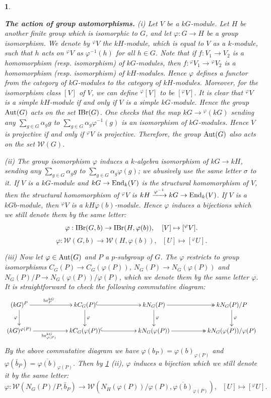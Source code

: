 \documentclass[preprint,12pt,3p]{elsarticle}
\newtheorem{void}[theorem]{}
\def\IBr{{\rm IBr}}
\def\br{{\rm br}}
\def\Aut{{\rm Aut}}
\def\End{{\rm End}}
\def\W{\mathcal{W}}
\begin{document}
\begin{void}\label{void:The action of group automorphisms}
{\rm \textbf{The action of group automorphisms.} (i) Let $V$ be a $kG$-module. Let $H$ be another finite group which is isomorphic to $G$, and let $\varphi:G\to H$ be a group isomorphism. We denote by ${}^\varphi V$ the $kH$-module, which is equal to $V$ as a $k$-module, such that $h$ acts on ${}^\varphi V$ as $\varphi^{-1}(h)$ for all $h\in G$. Note that if $f:V_1\to V_2$ is a homomorphism (resp. isomorphism) of $kG$-modules, then $f:{}^\varphi V_1\to {}^\varphi V_2$ is a homomorphism (resp. isomorphism) of $kH$-modules. Hence $\varphi$ defines a functor from the category of $kG$-modules to the category of $kH$-modules. Moreover, for the isomorphism class $[V]$ of $V$, we can define ${}^\varphi[V]$ to be $[{}^\varphi V]$. It is clear that ${}^\varphi V$ is a simple $kH$-module if and only if $V$ is a simple $kG$-module. Hence the group $\Aut(G)$ acts on the set $\IBr(G)$. One checks that the map $kG\to {}^\varphi(kG)$ sending any $\sum_{g\in G}\alpha_gg$ to $\sum_{g\in G} \alpha_g\varphi^{-1}(g)$ is an isomorphism of $kG$-modules. Hence $V$ is projective if and only if ${}^\varphi V$ is projective. Therefore, the group $\Aut(G)$ also acts on the set $\W(G)$. 
	

(ii) The group isomorphism $\varphi$ induces a $k$-algebra isomorphism of $kG\to kH$, sending any $\sum_{g\in G}\alpha_gg$ to $\sum_{g\in G}\alpha_g\varphi(g)$; we abusively use the same letter $\sigma$ to it. If $V$ is a $kG$-module and $kG\to \End_k(V)$ is the structural homomorphism of $V$, then the structural homomorphism of ${}^\varphi V$ is $kH\xrightarrow{\varphi^{-1}} kG\to \End_k(V)$. If $V$ is a $kGb$-module, then ${}^\varphi V$ is a $kH\varphi(b)$-module. Hence $\varphi$ induces a bijections which we still denote them by the same letter:
$$\varphi:\IBr(G,b)\to \IBr(H,\varphi(b)),~~~[V]\mapsto [{}^\varphi V].$$
$$\varphi:\W(G,b)\to \W(H,\varphi(b)),~~~[U]\mapsto [{}^\varphi U].$$

(iii) Now let $\varphi\in \Aut(G)$ and $P$ a $p$-subgroup of $G$. The $\varphi$ restricts to group isomorphisms $C_G(P)\to C_G(\varphi(P))$, $N_G(P)\to N_G(\varphi(P))$ and $N_G(P)/P\to N_G(\varphi(P))/\varphi(P)$, which we denote them by the same letter $\varphi$. It is straightforward to check the following commutative diagram:
$$\xymatrix{ (kG)^P\ar[d]_{\varphi}\ar[rr]^{\br_P^{kG}~~~} & & kC_G(P)\ar[d]^{\varphi}\ar@{^{(}->}[rr] &  & kN_G(P)\ar[d]^{\varphi} \ar@{->>}[rr]  &  & kN_G(P)/P \ar[d]^{\varphi}\\
	(kG)^{\varphi(P)}\ar[rr]_{\br_{\varphi(P)}^{kG}~~~} &  & kC_G(\varphi(P))\ar@{^{(}->}[rr]  &  &   kN_G(\varphi(P)) \ar@{->>}[rr] &   & kN_G(\varphi(P))/\varphi(P)
}$$
By the above commutative diagram we have $\varphi(b_P)=\varphi(b)_{\varphi(P)}$ and $\varphi(\bar{b}_P)=\overline{\varphi(b)}_{\varphi(P)}$. Then by \ref{void:The action of group automorphisms} (ii), $\varphi$ induces a bijection which we still denote it by the same letter:
$$\varphi:\W(N_G(P)/P,\bar{b}_P)\to \W(N_H(\varphi(P))/\varphi(P),\overline{\varphi(b)}_{\varphi(P)}),~~~[U]\mapsto [{}^\varphi U].$$
	
}
\end{void}
\end{document}
